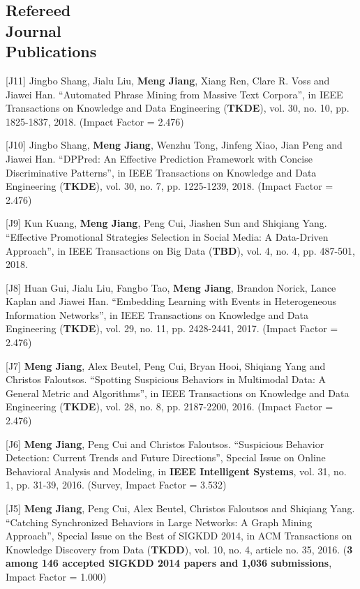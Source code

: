 \documentclass[margin, 9pt]{res}
\begin{document}
\begin{resume}

\section{Refereed \\ Journal \\ Publications}

[J11] Jingbo Shang, Jialu Liu, \textbf{Meng Jiang}, Xiang Ren, Clare R. Voss and Jiawei Han. ``Automated Phrase Mining from Massive Text Corpora'', in IEEE Transactions on Knowledge and Data Engineering (\textbf{TKDE}), vol. 30, no. 10, pp. 1825-1837, 2018. (Impact Factor = 2.476)

[J10] Jingbo Shang, \textbf{Meng Jiang}, Wenzhu Tong, Jinfeng Xiao, Jian Peng and Jiawei Han. ``DPPred: An Effective Prediction Framework with Concise Discriminative Patterns'', in IEEE Transactions on Knowledge and Data Engineering (\textbf{TKDE}), vol. 30, no. 7, pp. 1225-1239, 2018. (Impact Factor = 2.476)

[J9] Kun Kuang, \textbf{Meng Jiang}, Peng Cui, Jiashen Sun and Shiqiang Yang. ``Effective Promotional Strategies Selection in Social Media: A Data-Driven Approach'', in IEEE Transactions on Big Data (\textbf{TBD}), vol. 4, no. 4, pp. 487-501, 2018.

[J8] Huan Gui, Jialu Liu, Fangbo Tao, \textbf{Meng Jiang}, Brandon Norick, Lance Kaplan and Jiawei Han. ``Embedding Learning with Events in Heterogeneous Information Networks'', in IEEE Transactions on Knowledge and Data Engineering (\textbf{TKDE}), vol. 29, no. 11, pp. 2428-2441, 2017. (Impact Factor = 2.476)

[J7] \textbf{Meng Jiang}, Alex Beutel, Peng Cui, Bryan Hooi, Shiqiang Yang and Christos Faloutsos. ``Spotting Suspicious Behaviors in Multimodal Data: A General Metric and Algorithms'', in IEEE Transactions on Knowledge and Data Engineering (\textbf{TKDE}), vol. 28, no. 8, pp. 2187-2200, 2016. (Impact Factor = 2.476)

[J6] \textbf{Meng Jiang}, Peng Cui and Christos Faloutsos. ``Suspicious Behavior Detection: Current Trends and Future Directions'', Special Issue on Online Behavioral Analysis and Modeling, in \textbf{IEEE Intelligent Systems}, vol. 31, no. 1, pp. 31-39, 2016. (Survey, Impact Factor = 3.532)

[J5] \textbf{Meng Jiang}, Peng Cui, Alex Beutel, Christos Faloutsos and Shiqiang Yang. ``Catching Synchronized Behaviors in Large Networks: A Graph Mining Approach'', Special Issue on the Best of SIGKDD 2014, in ACM Transactions on Knowledge Discovery from Data (\textbf{TKDD}), vol. 10, no. 4, article no. 35, 2016. (\textbf{3 among 146 accepted SIGKDD 2014 papers and 1,036 submissions}, Impact Factor = 1.000)


\end{resume}
\end{document}
